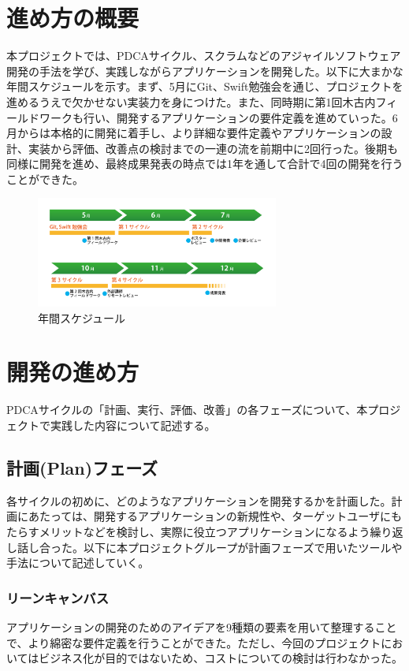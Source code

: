 \section{進め方の概要}
本プロジェクトでは、PDCAサイクル、スクラムなどのアジャイルソフトウェア開発の手法を学び、実践しながらアプリケーションを開発した。以下に大まかな年間スケジュールを示す。まず、5月にGit、Swift勉強会を通じ、プロジェクトを進めるうえで欠かせない実装力を身につけた。また、同時期に第1回木古内フィールドワークも行い、開発するアプリケーションの要件定義を進めていった。6月からは本格的に開発に着手し、より詳細な要件定義やアプリケーションの設計、実装から評価、改善点の検討までの一連の流を前期中に2回行った。後期も同様に開発を進め、最終成果発表の時点では1年を通して合計で4回の開発を行うことができた。
\begin{figure}
	\centering
	\includegraphics[width=8cm]{procedure-1.png}
	\caption{年間スケジュール}
\end{figure}

\section{開発の進め方}
PDCAサイクルの「計画、実行、評価、改善」の各フェーズについて、本プロジェクトで実践した内容について記述する。
\subsection{計画(Plan)フェーズ}
各サイクルの初めに、どのようなアプリケーションを開発するかを計画した。計画にあたっては、開発するアプリケーションの新規性や、ターゲットユーザにもたらすメリットなどを検討し、実際に役立つアプリケーションになるよう繰り返し話し合った。以下に本プロジェクトグループが計画フェーズで用いたツールや手法について記述していく。
\subsubsection{リーンキャンバス}
アプリケーションの開発のためのアイデアを9種類の要素を用いて整理することで、より綿密な要件定義を行うことができた。ただし、今回のプロジェクトにおいてはビジネス化が目的ではないため、コストについての検討は行わなかった。
